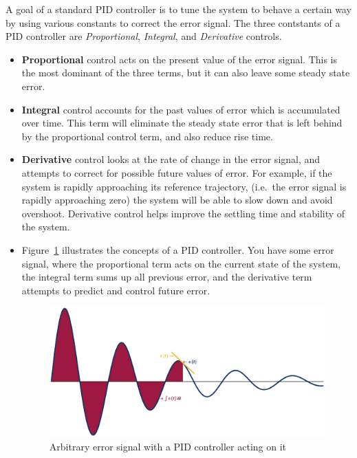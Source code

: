 A goal of a standard PID controller is to  tune the system to behave a certain
way by using various constants to correct the error signal. The three contstants
of a PID controller are \emph{Proportional}, \emph{Integral}, and \emph{Derivative}
controls.
\begin{itemize}
    \item \textbf{Proportional} control acts on the present value of the error signal. This is the most
          dominant of the three terms, but it can also leave some steady state error.
    \item\textbf{Integral} control accounts for the past values of error which is accumulated over time.
          This term will eliminate the steady state error that is left behind by the proportional control
          term, and also reduce rise time.
    \item \textbf{Derivative} control looks at the rate of change in the error signal, and attempts to
          correct for possible future values of error. For example, if the system is rapidly approaching
          its reference trajectory, (i.e.\ the error signal is rapidly approaching zero) the system will be
          able to slow down and avoid overshoot. Derivative control helps improve the settling time and
          stability of the system.
    \item Figure~\ref{fig:PIDExp} illustrates the concepts of a PID controller. You have some error
          signal, where the proportional term acts on the current state of the system, the integral term
          sums up all previous error, and the derivative term attempts to predict and control future error.

          \begin{figure}
              \centering
              \includegraphics[width = 0.8\hsize]{pix/PIDSchematic.eps}
              \caption{Arbitrary error signal with a PID controller acting on it}\label{fig:PIDExp}
          \end{figure}
\end{itemize}

